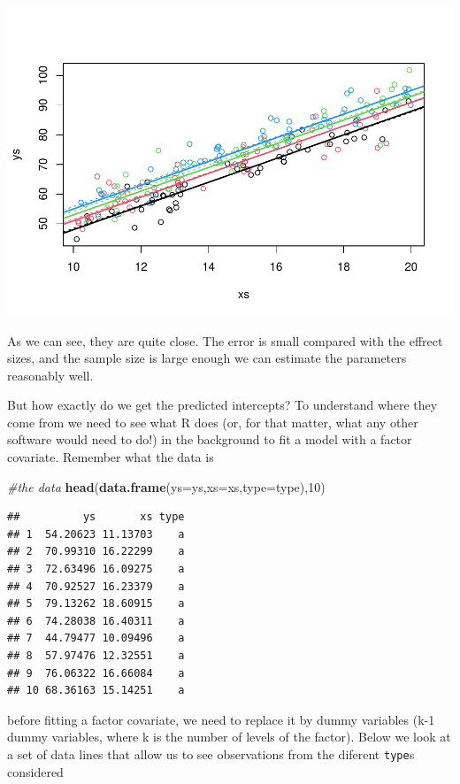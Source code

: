 \documentclass[
]{book}
\newenvironment{Shaded}{\begin{snugshade}}{\end{snugshade}}
\newcommand{\CommentTok}[1]{\textcolor[rgb]{0.56,0.35,0.01}{\textit{#1}}}
\newcommand{\DataTypeTok}[1]{\textcolor[rgb]{0.13,0.29,0.53}{#1}}
\newcommand{\DecValTok}[1]{\textcolor[rgb]{0.00,0.00,0.81}{#1}}
\newcommand{\KeywordTok}[1]{\textcolor[rgb]{0.13,0.29,0.53}{\textbf{#1}}}
\newcommand{\NormalTok}[1]{#1}
\begin{document}
\includegraphics{ECOMODbook_files/figure-latex/a9.8-1.pdf}

As we can see, they are quite close. The error is small compared with the effrect sizes, and the sample size is large enough we can estimate the parameters reasonably well.

But how exactly do we get the predicted intercepts? To understand where they come from we need to see what R does (or, for that matter, what any other software would need to do!) in the background to fit a model with a factor covariate. Remember what the data is

\begin{Shaded}
\begin{Highlighting}[]
\CommentTok{#the data}
\KeywordTok{head}\NormalTok{(}\KeywordTok{data.frame}\NormalTok{(}\DataTypeTok{ys=}\NormalTok{ys,}\DataTypeTok{xs=}\NormalTok{xs,}\DataTypeTok{type=}\NormalTok{type),}\DecValTok{10}\NormalTok{)}
\end{Highlighting}
\end{Shaded}

\begin{verbatim}
##          ys       xs type
## 1  54.20623 11.13703    a
## 2  70.99310 16.22299    a
## 3  72.63496 16.09275    a
## 4  70.92527 16.23379    a
## 5  79.13262 18.60915    a
## 6  74.28038 16.40311    a
## 7  44.79477 10.09496    a
## 8  57.97476 12.32551    a
## 9  76.06322 16.66084    a
## 10 68.36163 15.14251    a
\end{verbatim}

before fitting a factor covariate, we need to replace it by dummy variables (k-1 dummy variables, where k is the number of levels of the factor). Below we look at a set of data lines that allow us to see observations from the diferent \texttt{type}s considered
\end{document}
